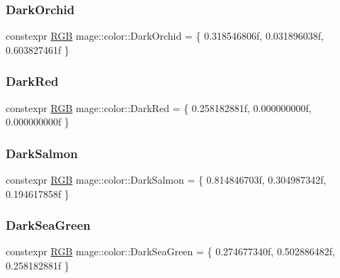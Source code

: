 \subsubsection{\texorpdfstring{Dark\+Orchid}{DarkOrchid}}
{\footnotesize\ttfamily constexpr \hyperlink{structmage_1_1_r_g_b}{R\+GB} mage\+::color\+::\+Dark\+Orchid = \{ 0.\+318546806f, 0.\+031896038f, 0.\+603827461f \}}

\hypertarget{namespacemage_1_1color_af3e92bec90aaaae7e505af23ff81ecdf}{}\label{namespacemage_1_1color_af3e92bec90aaaae7e505af23ff81ecdf} 
\subsubsection{\texorpdfstring{Dark\+Red}{DarkRed}}
{\footnotesize\ttfamily constexpr \hyperlink{structmage_1_1_r_g_b}{R\+GB} mage\+::color\+::\+Dark\+Red = \{ 0.\+258182881f, 0.\+000000000f, 0.\+000000000f \}}

\hypertarget{namespacemage_1_1color_ab179d9d88e39d4aab420b3b5c774b416}{}\label{namespacemage_1_1color_ab179d9d88e39d4aab420b3b5c774b416} 
\subsubsection{\texorpdfstring{Dark\+Salmon}{DarkSalmon}}
{\footnotesize\ttfamily constexpr \hyperlink{structmage_1_1_r_g_b}{R\+GB} mage\+::color\+::\+Dark\+Salmon = \{ 0.\+814846703f, 0.\+304987342f, 0.\+194617858f \}}

\hypertarget{namespacemage_1_1color_a1e835bd8a981b6e1d26267e774b32c74}{}\label{namespacemage_1_1color_a1e835bd8a981b6e1d26267e774b32c74} 
\subsubsection{\texorpdfstring{Dark\+Sea\+Green}{DarkSeaGreen}}
{\footnotesize\ttfamily constexpr \hyperlink{structmage_1_1_r_g_b}{R\+GB} mage\+::color\+::\+Dark\+Sea\+Green = \{ 0.\+274677340f, 0.\+502886482f, 0.\+258182881f \}}

\hypertarget{namespacemage_1_1color_a5dad9107a42e3b57733617d884850bce}{}\label{namespacemage_1_1color_a5dad9107a42e3b57733617d884850bce} 
